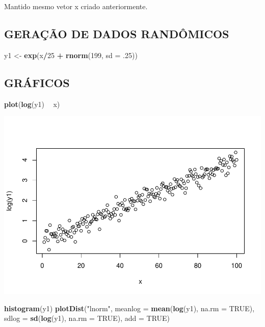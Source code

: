 \documentclass[]{article}
\newenvironment{Shaded}{\begin{snugshade}}{\end{snugshade}}
\newcommand{\KeywordTok}[1]{\textcolor[rgb]{0.13,0.29,0.53}{\textbf{#1}}}
\newcommand{\DataTypeTok}[1]{\textcolor[rgb]{0.13,0.29,0.53}{#1}}
\newcommand{\DecValTok}[1]{\textcolor[rgb]{0.00,0.00,0.81}{#1}}
\newcommand{\StringTok}[1]{\textcolor[rgb]{0.31,0.60,0.02}{#1}}
\newcommand{\OtherTok}[1]{\textcolor[rgb]{0.56,0.35,0.01}{#1}}
\newcommand{\OperatorTok}[1]{\textcolor[rgb]{0.81,0.36,0.00}{\textbf{#1}}}
\newcommand{\NormalTok}[1]{#1}
\begin{document}
Mantido mesmo vetor x criado anteriormente.

\subsection{GERAÇÃO DE DADOS
RANDÔMICOS}\label{geracao-de-dados-randomicos-1}

\begin{Shaded}
\begin{Highlighting}[]
\NormalTok{y1 <-}\StringTok{ }\KeywordTok{exp}\NormalTok{(x}\OperatorTok{/}\DecValTok{25} \OperatorTok{+}\StringTok{ }\KeywordTok{rnorm}\NormalTok{(}\DecValTok{199}\NormalTok{, }\DataTypeTok{sd =}\NormalTok{ .}\DecValTok{25}\NormalTok{)) }
\end{Highlighting}
\end{Shaded}

\subsection{GRÁFICOS}\label{graficos-1}

\begin{Shaded}
\begin{Highlighting}[]
\KeywordTok{plot}\NormalTok{(}\KeywordTok{log}\NormalTok{(y1) }\OperatorTok{~}\StringTok{ }\NormalTok{x)}
\end{Highlighting}
\end{Shaded}

\includegraphics{Impacto_sigma_files/figure-latex/unnamed-chunk-7-1.pdf}

\begin{Shaded}
\begin{Highlighting}[]
\KeywordTok{histogram}\NormalTok{(y1)}
\KeywordTok{plotDist}\NormalTok{(}\StringTok{"lnorm"}\NormalTok{, }
         \DataTypeTok{meanlog =} \KeywordTok{mean}\NormalTok{(}\KeywordTok{log}\NormalTok{(y1), }\DataTypeTok{na.rm =} \OtherTok{TRUE}\NormalTok{),}
         \DataTypeTok{sdlog =} \KeywordTok{sd}\NormalTok{(}\KeywordTok{log}\NormalTok{(y1), }\DataTypeTok{na.rm =} \OtherTok{TRUE}\NormalTok{), }
         \DataTypeTok{add =} \OtherTok{TRUE}\NormalTok{)}
\end{Highlighting}
\end{Shaded}
\end{document}
